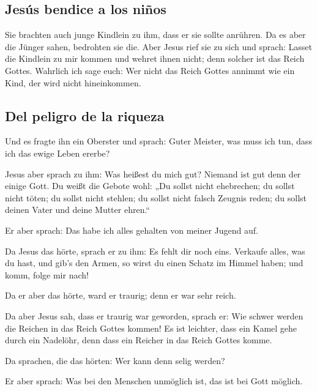 \hypertarget{jesuxfas-bendice-a-los-niuxf1os}{%
\subsection{Jesús bendice a los
niños}\label{jesuxfas-bendice-a-los-niuxf1os}}

 Sie brachten auch junge Kindlein zu ihm, dass er sie
sollte anrühren. Da es aber die Jünger sahen, bedrohten sie die.
 Aber Jesus rief sie zu sich und sprach: Lasset die
Kindlein zu mir kommen und wehret ihnen nicht; denn solcher ist das
Reich Gottes.  Wahrlich ich sage euch: Wer nicht das
Reich Gottes annimmt wie ein Kind, der wird nicht hineinkommen.

\hypertarget{del-peligro-de-la-riqueza}{%
\subsection{Del peligro de la riqueza}\label{del-peligro-de-la-riqueza}}

 Und es fragte ihn ein Oberster und sprach: Guter
Meister, was muss ich tun, dass ich das ewige Leben ererbe?

 Jesus aber sprach zu ihm: Was heißest du mich gut?
Niemand ist gut denn der einige Gott.  Du weißt die
Gebote wohl: „Du sollst nicht ehebrechen; du sollst nicht töten; du
sollst nicht stehlen; du sollst nicht falsch Zeugnis reden; du sollst
deinen Vater und deine Mutter ehren.``

 Er aber sprach: Das habe ich alles gehalten von meiner
Jugend auf.

 Da Jesus das hörte, sprach er zu ihm: Es fehlt dir noch
eins. Verkaufe alles, was du hast, und gib's den Armen, so wirst du
einen Schatz im Himmel haben; und komm, folge mir nach!

 Da er aber das hörte, ward er traurig; denn er war sehr
reich.

 Da aber Jesus sah, dass er traurig war geworden, sprach
er: Wie schwer werden die Reichen in das Reich Gottes kommen!
 Es ist leichter, dass ein Kamel gehe durch ein Nadelöhr,
denn dass ein Reicher in das Reich Gottes komme.

 Da sprachen, die das hörten: Wer kann denn selig werden?

 Er aber sprach: Was bei den Menschen unmöglich ist, das
ist bei Gott möglich.

